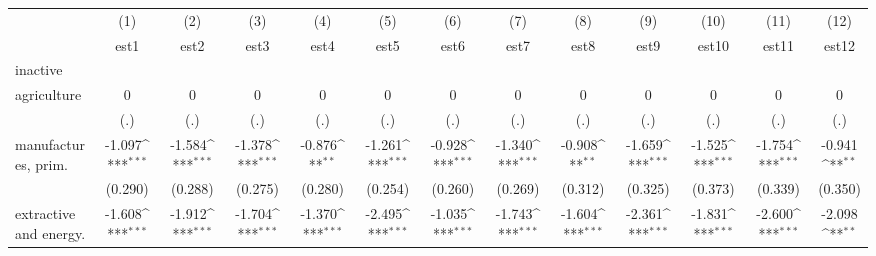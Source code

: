 {
\def\sym#1{\ifmmode^{#1}\else\(^{#1}\)\fi}
\begin{tabular}{l*{12}{c}}
\hline\hline
                    &\multicolumn{1}{c}{(1)}&\multicolumn{1}{c}{(2)}&\multicolumn{1}{c}{(3)}&\multicolumn{1}{c}{(4)}&\multicolumn{1}{c}{(5)}&\multicolumn{1}{c}{(6)}&\multicolumn{1}{c}{(7)}&\multicolumn{1}{c}{(8)}&\multicolumn{1}{c}{(9)}&\multicolumn{1}{c}{(10)}&\multicolumn{1}{c}{(11)}&\multicolumn{1}{c}{(12)}\\
                    &\multicolumn{1}{c}{est1}&\multicolumn{1}{c}{est2}&\multicolumn{1}{c}{est3}&\multicolumn{1}{c}{est4}&\multicolumn{1}{c}{est5}&\multicolumn{1}{c}{est6}&\multicolumn{1}{c}{est7}&\multicolumn{1}{c}{est8}&\multicolumn{1}{c}{est9}&\multicolumn{1}{c}{est10}&\multicolumn{1}{c}{est11}&\multicolumn{1}{c}{est12}\\
\hline
inactive            &                     &                     &                     &                     &                     &                     &                     &                     &                     &                     &                     &                     \\
agriculture         &           0         &           0         &           0         &           0         &           0         &           0         &           0         &           0         &           0         &           0         &           0         &           0         \\
                    &         (.)         &         (.)         &         (.)         &         (.)         &         (.)         &         (.)         &         (.)         &         (.)         &         (.)         &         (.)         &         (.)         &         (.)         \\
[1em]
manufactures, prim. &      -1.097\sym{***}&      -1.584\sym{***}&      -1.378\sym{***}&      -0.876\sym{**} &      -1.261\sym{***}&      -0.928\sym{***}&      -1.340\sym{***}&      -0.908\sym{**} &      -1.659\sym{***}&      -1.525\sym{***}&      -1.754\sym{***}&      -0.941\sym{**} \\
                    &     (0.290)         &     (0.288)         &     (0.275)         &     (0.280)         &     (0.254)         &     (0.260)         &     (0.269)         &     (0.312)         &     (0.325)         &     (0.373)         &     (0.339)         &     (0.350)         \\
[1em]
extractive and energy.&      -1.608\sym{***}&      -1.912\sym{***}&      -1.704\sym{***}&      -1.370\sym{***}&      -2.495\sym{***}&      -1.035\sym{***}&      -1.743\sym{***}&      -1.604\sym{***}&      -2.361\sym{***}&      -1.831\sym{***}&      -2.600\sym{***}&      -2.098\sym{**} \\

\end{tabular}}
